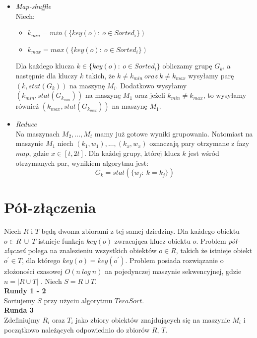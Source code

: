 \documentclass{pracamgr}
\begin{document}
\begin{itemize}
    \item \textit{Map-shuffle} \\
    Niech:
    \begin{itemize}
        \item \(k_{min} = min(\{key(o) : \ o \in Sorted_i \})\)
        \item \(k_{max} = max(\{key(o) : \ o \in Sorted_i \})\)
    \end{itemize}
    
    Dla każdego klucza \(k \in \{key(o): \ o \in Sorted_i\}\) obliczamy grupę \(G_k\), a następnie
    dla kluczy \(k\) takich, że \(k \neq k_{min} \ oraz \ k \neq k_{max}\) wysyłamy parę \((k, stat(G_k))\) na maszynę \(M_i\).
    Dodatkowo wysyłamy \((k_{min}, stat(G_{k_{min}}))\) na maszynę \(M_1\) oraz jeżeli \(k_{min} \neq k_{max}\), to wysyłamy również \((k_{max}, stat(G_{k_{max}}))\) na maszynę \(M_1\).

    \item \textit{Reduce} \\
    Na maszynach \(M_2, ..., M_t\) mamy już gotowe wyniki grupowania. Natomiast na maszynie \(M_1\) niech \((k_1, w_1), ..., (k_x, w_x)\) oznaczają pary otrzymane z fazy \(map\), gdzie \(x \in [t, 2t]\). Dla każdej grupy, której klucz \(k\) jest wśród otrzymanych par, wynikiem algorytmu jest:\\
            $$G_k = stat(\{w_j: \ k = k_j\})$$
\end{itemize}
\section{Pół-złączenia}
Niech \(R\) i \(T\) będą dwoma zbiorami z tej samej dziedziny. Dla każdego obiektu \(o \in R \ \cup \  T\) istnieje funkcja \(key(o)\) zwracająca klucz obiektu \(o\). Problem \textit{pół-złączeń} polega na znalezieniu wszystkich obiektów \(o \in R\), takich że istnieje obiekt \(o^\prime \in T\), dla którego \(key(o) = key(o^\prime)\). Problem posiada rozwiązanie o złożoności czasowej \(O(n \ log \  n)\) na pojedynczej maszynie sekwencyjnej, gdzie \(n = |R \cup T|\) \cite{tao2013minimal}.
Niech \(S = R \cup T\). \\

\textbf{Rundy 1 - 2} \\
Sortujemy \(S\) przy użyciu algorytmu \(TeraSort\). \\

\textbf{Runda 3} \\
Zdefiniujmy \(R_i\) oraz \(T_i\) jako zbiory obiektów znajdujących się na maszynie \(M_i\) i początkowo należących odpowiednio do zbiorów \(R\), \(T\).
\end{document}
